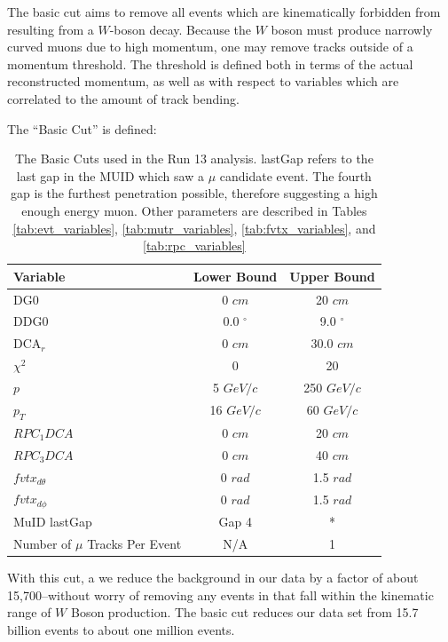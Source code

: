 The basic cut aims to remove all events which are kinematically forbidden from
resulting from a $W$-boson decay. Because the $W$ boson must produce narrowly
curved muons due to high momentum, one may remove tracks outside of a momentum
threshold. The threshold is defined both in terms of the actual reconstructed
momentum, as well as with respect to variables which are correlated to the
amount of track bending.

{\noindent}The ``Basic Cut'' is defined:
\begin{table}[ht]
  \centering
  \begin{tabular}{l c c}
    \toprule
    \textbf{Variable} & \textbf{Lower Bound} & \textbf{Upper Bound} \\
    \midrule
    DG0 & 0 $cm$ & 20 $cm$ \\
    DDG0 & 0.0 $^\circ$ & 9.0 $^\circ$ \\
    DCA$_r$ & 0 $cm$ & 30.0 $cm$ \\
    $\chi^2$ & 0 & 20 \\
    $p$ & 5 $GeV/c$ & 250 $GeV/c$ \\
    $p_T$ & 16 $GeV/c$ & 60 $GeV/c$ \\ 
    $RPC_1DCA$ & 0 $cm$ & 20 $cm$ \\
    $RPC_3DCA$ & 0 $cm$ & 40 $cm$ \\
    $fvtx_{d\theta}$ & 0 $rad$ & 1.5 $rad$ \\
    $fvtx_{d\phi}$ & 0 $rad$ & 1.5 $rad$ \\
    MuID lastGap & Gap 4 & * \\ 
    Number of $\mu$ Tracks Per Event & N/A & 1 \\
    \bottomrule
  \end{tabular}
  \caption{ 
    The Basic Cuts used in the Run 13 analysis. lastGap refers to the last gap
    in the MUID which saw a $\mu$ candidate event. The fourth gap is the
    furthest penetration possible, therefore suggesting a high enough energy
    muon.  Other parameters are described in Tables \ref{tab:evt_variables},
    \ref{tab:mutr_variables}, \ref{tab:fvtx_variables}, and
    \ref{tab:rpc_variables}
  }
  \label{tab:basic_cut}
\end{table}

With this cut, a we reduce the background in our data by a factor of about
15,700--without worry of removing any events in that fall within the kinematic
range of $W$ Boson production. The basic cut reduces our data set from 15.7
billion events to about one million events.

